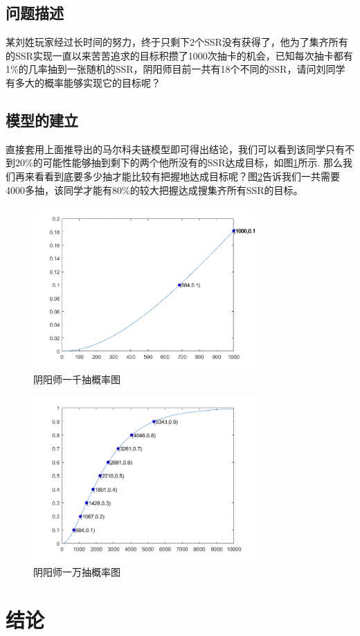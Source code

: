 \documentclass[10pt,journal,compsoc]{IEEEtran}
\begin{document}
\subsection{问题描述}
某刘姓玩家经过长时间的努力，终于只剩下2个SSR没有获得了，他为了集齐所有的SSR实现一直以来苦苦追求的目标积攒了1000次抽卡的机会，已知每次抽卡都有1\%的几率抽到一张随机的SSR，阴阳师目前一共有18个不同的SSR，请问刘同学有多大的概率能够实现它的目标呢？

\subsection{模型的建立}
直接套用上面推导出的马尔科夫链模型即可得出结论，我们可以看到该同学只有不到20\%的可能性能够抽到剩下的两个他所没有的SSR达成目标，如图\ref{fig:yys1k}所示. 那么我们再来看看到底要多少抽才能比较有把握地达成目标呢？图\ref{fig:yys1w}告诉我们一共需要4000多抽，该同学才能有80\%的较大把握达成搜集齐所有SSR的目标。

\begin{figure}[H]
  \centering
  \includegraphics[width=20pc]{img/yys1k.png}
  \caption{阴阳师一千抽概率图}
  \label{fig:yys1k}
\end{figure}

\begin{figure}[H]
  \centering
  \includegraphics[width=20pc]{img/yys1w.png}
  \caption{阴阳师一万抽概率图}
  \label{fig:yys1w}
\end{figure}


\section{结论}





\end{document}
